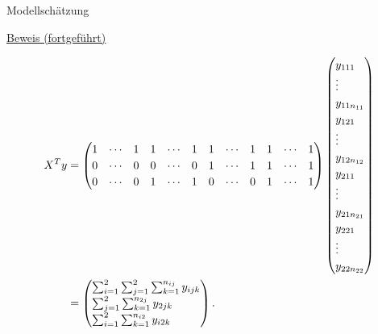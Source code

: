 \documentclass[
  8pt,
  ignorenonframetext,
]{beamer}
\begin{document}
\begin{frame}{Modellschätzung}
\protect\hypertarget{modellschuxe4tzung-1}{}
\footnotesize
\vspace{1mm}

\underline{Beweis (fortgeführt)}

\tiny

\begin{align}
\renewcommand{\arraystretch}{1.2}
\begin{split}
X^Ty
& =
\setcounter{MaxMatrixCols}{20}
\begin{pmatrix}
1 & \cdots & 1 & 1 & \cdots & 1 & 1 & \cdots & 1 & 1 & \cdots & 1   \\
0 & \cdots & 0 & 0 & \cdots & 0 & 1 & \cdots & 1 & 1 & \cdots & 1   \\
0 & \cdots & 0 & 1 & \cdots & 1 & 0 & \cdots & 0 & 1 & \cdots & 1   \\
\end{pmatrix}
\begin{pmatrix*}[l]
y_{111}     \\  \vdots  \\ y_{11n_{11}}
\\
y_{121}     \\  \vdots  \\ y_{12n_{12}}
\\
y_{211}     \\  \vdots  \\ y_{21n_{21}}
\\
y_{221}     \\  \vdots  \\ y_{22n_{22}}
\end{pmatrix*}
\\
& =
\begin{pmatrix*}[l]
\sum_{i=1}^2 \sum_{j=1}^2 \sum_{k = 1}^{n_{ij}} y_{ijk}     \\
\sum_{j=1}^2 \sum_{k = 1}^{n_{2j}} y_{2jk}                  \\
\sum_{i=1}^2 \sum_{k = 1}^{n_{i2}} y_{i2k}                  \\
\end{pmatrix*}.
\end{split}
\end{align}
\end{frame}
\end{document}
